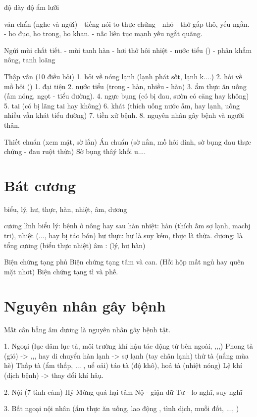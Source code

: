 độ dày 
độ ẩm lưỡi

văn chẩn (nghe và ngửi)
- tiếng nói to thực chứng
- nhỏ
- thở gấp thô, yếu ngắn.
- ho đục, ho trong, ho khan.
- nấc liên tục mạnh yếu ngắt quãng.

Ngửi mùi chất tiết.
- mùi tanh hàn
- hơi thở hôi nhiệt
- nước tiểu ()
- phân khắm nông, tanh loãng

Thập vấn (10 điều hỏi)
1. hỏi về nóng lạnh (lạnh phát sốt, lạnh k....)
2. hỏi về mồ hôi ()
1. đại tiện
2. nước tiểu (trong  - hàn, nhiều - hàn)
3. ẩm thực ăn uống (ấm nóng, ngọt - tiểu đường). 
4. ngực bụng (có bị đau, sườn có căng hay không)
5. tai (có bị lãng tai hay không)
6. khát (thích uống nước ấm, hay lạnh, uống nhiều vẫn khát tiểu đường)
7. tiền xử bệnh.
8. nguyên nhân gây bệnh và người thân.

Thiết chuẩn (xem mặt, sờ lắn)
Án chuẩn (sờ nắn, mồ hôi dính, sờ bụng đau thực chứng - đau ruột thừa)
Sờ bụng thâý khối u....

\section{Bát cương}
biểu, lý, hư, thực, hàn, nhiệt, âm, dương

cương lĩnh biểu lý: bệnh ở nông hay sau
hàn nhiệt: hàn (thích ấm sợ lạnh, machj tri), nhiệt (..., hay bị táo bón)
hư thực: hư là suy kém, thực là thừa.
dương: là tổng cương (biểu thực nhiệt)
âm : (lý, hư hàn)

Biện chứng tạng phủ
Biện chứng tạng tâm và can. (Hồi hộp mất ngủ hay quên mặt nhơt)
Biện chứng tạng tì và phế.

\section{Nguyên nhân gây bệnh}
Mất cân bằng âm dương là nguyên nhân gây bệnh tật.

1. Ngoại (lục dâm lục tà, môi trường khí hậu tác động từ bên  ngoài, ,,,)
   Phong tà (gió) -> ,,, hay di chuyển 
   hàn lạnh -> sợ lạnh (tay chân lạnh)
   thử tà (nắng mùa hè)
   Thấp tà (ẩm thấp, ... , uể oải) 
   táo tà (độ khô), 
   hoả tà (nhiệt nóng)
   Lệ khí (dịch bệnh) -> thay đổi khí hâụ.
   
2. Nội (7 tình cảm)
    Hỷ Mừng quá hại tâm
    Nộ - giận dữ
    Tư - lo nghĩ, suy nghĩ
    
    
3. Bất ngoại nội nhân (ẩm thực ăn uống, lao động , tình dịch, muỗi đốt, ..., )
